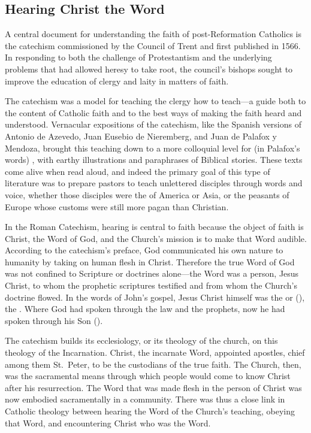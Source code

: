 \subsection{Hearing Christ the Word}

A central document for understanding the faith of post-Reformation Catholics is the catechism  commissioned by the Council of Trent and first published in 1566.%
    \Autocites{Catholic:Catechismus1614}[]{NewCatholic}
In responding to both the challenge of Protestantism and the underlying problems that had allowed heresy to take root, the council's bishops sought to improve the education of clergy and laity in matters of faith.%
\citXXX[Trent]

The catechism was a model for teaching the clergy how to teach---a guide both to the content of Catholic faith and to the best ways of making the faith heard and understood.
Vernacular expositions of the catechism, like the Spanish versions of Antonio de Azevedo, Juan Eusebio de Nieremberg, and Juan de Palafox y Mendoza, brought this teaching down to a more colloquial level for (in Palafox's words) , with earthy illustrations and paraphrases of Biblical stories.%
    \Autocites{Azevedo:Catecismo}{Nieremberg:PracticaCatecismo}{Palafox:Bocados}
These texts come alive when read aloud, and indeed the primary goal of this type of literature was to prepare pastors to teach unlettered disciples through words and voice, whether those disciples were the  of America or Asia, or the peasants of Europe whose customs were still more pagan than Christian.%

In the Roman Catechism, hearing is central to faith because the object of faith is Christ, the Word of God, and the Church's mission is to make that Word audible.
According to the catechism's preface, God communicated his own nature to humanity by taking on human flesh in Christ.
Therefore the true Word of God was not confined to Scripture or doctrines alone---the Word was a person, Jesus Christ, to whom the prophetic scriptures testified and from whom the Church's doctrine flowed.
In the words of John's gospel, Jesus Christ himself was the  or  (), the .
Where God had spoken through the law and the prophets, now he had spoken through his Son ().

The catechism builds its ecclesiology, or its theology of the church, on this theology of the Incarnation.
Christ, the incarnate Word, appointed apostles, chief among them St.\ Peter, to be the custodians of the true faith.
The Church, then, was the sacramental means through which people would come to know Christ after his resurrection.
The Word that was made flesh in the person of Christ was now embodied sacramentally in a community.
There was thus a close link in Catholic theology between hearing the Word of the Church's teaching, obeying that Word, and encountering Christ who was the Word.


